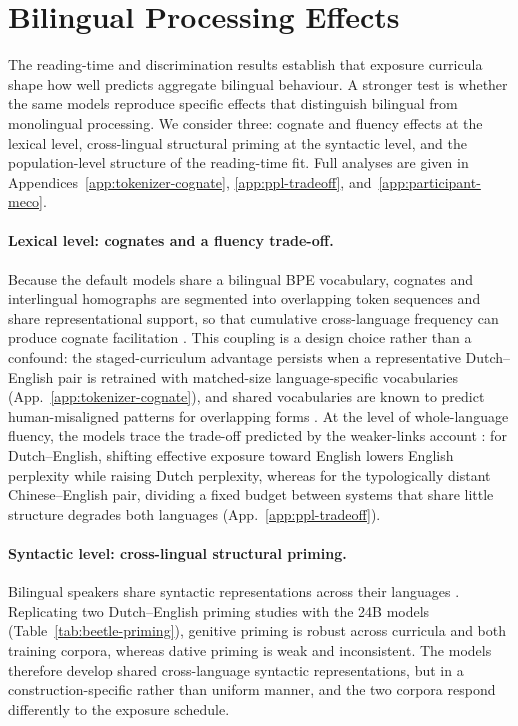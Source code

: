 \section{Bilingual Processing Effects}\label{sec:bilingual-processing}

The reading-time and discrimination results establish that exposure curricula shape how well \beetle{} predicts aggregate bilingual behaviour. A stronger test is whether the same models reproduce specific effects that distinguish bilingual from monolingual processing. We consider three: cognate and fluency effects at the lexical level, cross-lingual structural priming at the syntactic level, and the population-level structure of the reading-time fit. Full analyses are given in Appendices~\ref{app:tokenizer-cognate}, \ref{app:ppl-tradeoff}, and~\ref{app:participant-meco}.

\paragraph{Lexical level: cognates and a fluency trade-off.} Because the default models share a bilingual BPE vocabulary, cognates and interlingual homographs are segmented into overlapping token sequences and share representational support, so that cumulative cross-language frequency can produce cognate facilitation \citep{winther2021cumulative,dijkstra2002architecture}. This coupling is a design choice rather than a confound: the staged-curriculum advantage persists when a representative Dutch--English pair is retrained with matched-size language-specific vocabularies (App.~\ref{app:tokenizer-cognate}), and shared vocabularies are known to predict human-misaligned patterns for overlapping forms \citep{skrjanec2026crosslingual}. At the level of whole-language fluency, the models trace the trade-off predicted by the weaker-links account \citep{gollan2008weaker,whitford2015second}: for Dutch--English, shifting effective exposure toward English lowers English perplexity while raising Dutch perplexity, whereas for the typologically distant Chinese--English pair, dividing a fixed budget between systems that share little structure degrades both languages (App.~\ref{app:ppl-tradeoff}).

\paragraph{Syntactic level: cross-lingual structural priming.} Bilingual speakers share syntactic representations across their languages \citep{hartsuiker2004crosslinguistic}. Replicating two Dutch--English priming studies with the 24B models (Table~\ref{tab:beetle-priming}), genitive priming \citep{bernolet2013language} is robust across curricula and both training corpora, whereas dative priming \citep{schoonbaert2007representation} is weak and inconsistent. The models therefore develop shared cross-language syntactic representations, but in a construction-specific rather than uniform manner, and the two corpora respond differently to the exposure schedule.

